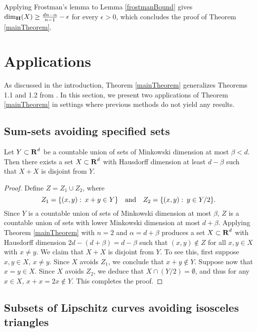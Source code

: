 Applying Frostman's lemma to Lemma \ref{frostmanBound} gives $\operatorname{\dim_{\mathbf{H}}}(X) \geq \frac{dn - \alpha}{n - 1} - \epsilon$ for every $\epsilon>0$, which concludes the proof of Theorem \ref{mainTheorem}.









\section{Applications}\label{applications}

As discussed in the introduction, Theorem \ref{mainTheorem} generalizes Theorems 1.1 and 1.2 from \cite{MalabikaRob}. In this section, we present two applications of Theorem \ref{mainTheorem} in settings where previous methods do not yield any results.

\subsection{Sum-sets avoiding specified sets}

\begin{theorem} \label{sumset-application} 
	Let $Y \subset \operatorname{\mathbf{R}}^d$ be a countable union of sets of Minkowski dimension at most $\beta < d$. Then there exists a set $X \subset \operatorname{\mathbf{R}}^d$ with Hausdorff dimension at least $d - \beta$ such that $X + X$ is disjoint from $Y$.
\end{theorem}
\begin{proof}
	Define $Z = Z_1 \cup Z_2$, where
	\[ Z_1 = \{ (x,y) \operatorname{\colon} x + y \in Y \} \quad \text{and} \quad Z_2 = \{ (x,y) \operatorname{\colon} y \in Y/2 \}. \]
	Since $Y$ is a countable union of sets of Minkowski dimension at most $\beta$, $Z$ is a countable union of sets with lower Minkowski dimension at most $d + \beta$. Applying Theorem \ref{mainTheorem} with $n = 2$ and $\alpha = d + \beta$ produces a set $X \subset \operatorname{\mathbf{R}}^d$ with Hausdorff dimension $2d  - (d + \beta) = d - \beta$ such that $(x,y) \not \in Z$ for all $x,y \in X$ with $x \neq y$. We claim that $X+ X$ is disjoint from $Y$. To see this, first suppose $x, y \in X$, $x \ne y$. Since $X$ avoids $Z_1$, we conclude that $x + y \not \in Y$. Suppose now that $x = y \in X$. Since $X$ avoids $Z_2$, we deduce that $X \cap (Y/2) = \emptyset$, and thus for any $x \in X$, $x + x = 2x \not \in Y$. This completes the proof.
\end{proof}


\subsection{Subsets of Lipschitz curves avoiding isosceles triangles}

